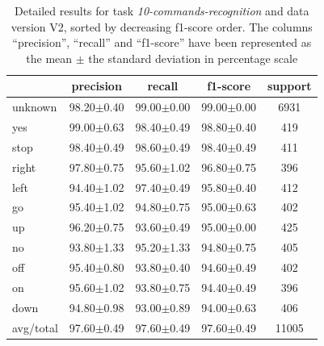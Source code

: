 \documentclass[review]{elsarticle}
\begin{document}
\begin{table} \centering \scriptsize
	\caption{Detailed results for task \textit{10-commands-recognition} and data version V2, sorted by decreasing f1-score order. The columns ``precision'', ``recall'' and ``f1-score'' have been represented as the mean $\pm$ the standard deviation in percentage scale }
	\begin{tabular}{lcccc}
		\toprule
		{} &       precision &          recall &        f1-score & support \\
		\midrule
		unknown   &  98.20$\pm$0.40 &  99.00$\pm$0.00 &  99.00$\pm$0.00 &    6931 \\
		yes       &  99.00$\pm$0.63 &  98.40$\pm$0.49 &  98.80$\pm$0.40 &     419 \\
		stop      &  98.40$\pm$0.49 &  98.60$\pm$0.49 &  98.40$\pm$0.49 &     411 \\
		right     &  97.80$\pm$0.75 &  95.60$\pm$1.02 &  96.80$\pm$0.75 &     396 \\
		left      &  94.40$\pm$1.02 &  97.40$\pm$0.49 &  95.80$\pm$0.40 &     412 \\
		go        &  95.40$\pm$1.02 &  94.80$\pm$0.75 &  95.00$\pm$0.63 &     402 \\
		up        &  96.20$\pm$0.75 &  93.60$\pm$0.49 &  95.00$\pm$0.00 &     425 \\
		no        &  93.80$\pm$1.33 &  95.20$\pm$1.33 &  94.80$\pm$0.75 &     405 \\
		off       &  95.40$\pm$0.80 &  93.80$\pm$0.40 &  94.60$\pm$0.49 &     402 \\
		on        &  95.60$\pm$1.02 &  93.80$\pm$0.75 &  94.40$\pm$0.49 &     396 \\
		down      &  94.80$\pm$0.98 &  93.00$\pm$0.89 &  94.00$\pm$0.63 &     406 \\
		\midrule avg/total &  97.60$\pm$0.49 &  97.60$\pm$0.49 &  97.60$\pm$0.49 &   11005 \\
		\bottomrule
	\end{tabular}
	
\end{table}
\end{document}
